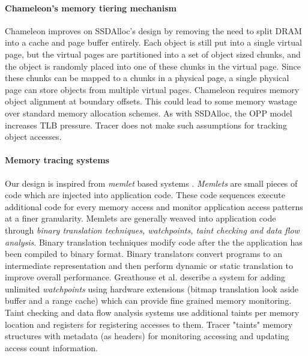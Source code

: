 \paragraph{Chameleon's memory tiering mechanism}
Chameleon improves on SSDAlloc's design by removing the need to split DRAM into a cache and page buffer entirely. Each object is still put into a single virtual page, but the virtual pages are partitioned into a set of object sized chunks, and the object is randomly placed into one of these chunks in the virtual page. Since these chunks can be mapped to a chunks in a physical page, a single physical page can store objects from multiple virtual pages. Chameleon requires memory object alignment at boundary offsets. This could lead to some memory wastage over standard memory allocation schemes. As with SSDAlloc, the OPP model increases TLB pressure. Tracer does not make such assumptions for tracking object accesses.

\paragraph{Memory tracing systems}
Our design is inspired from {\emph{memlet}} based systems \cite{}. {\emph{Memlets}} are small pieces of code which are injected into application code. These code sequences execute additional code for every memory access and monitor application access patterns at a finer granularity. Memlets are generally weaved into application code through {\emph{binary translation techniques, watchpoints, taint checking and data flow analysis}}.
Binary translation techniques modify code after the the application has been compiled to binary format. Binary translators {\cite{nethercote2007valgrind,bellard2005qemu}} convert programs to an intermediate representation and then perform dynamic or static translation to improve overall performance. Greathouse et al. \cite{greathouse2012case} describe a system for adding unlimited {\emph{watchpoints}} using hardware extensions (bitmap translation look aside buffer and a range cache) which can provide fine grained memory monitoring. Taint checking \cite{newsome2005dynamic, ho2006practical} and data flow analysis systems use additional taints per memory location and registers for registering accesses to them. Tracer "taints" memory structures with metadata (as headers) for monitoring accessing and updating access count information.

\paragraph{}
